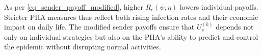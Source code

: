 \documentclass[sigconf,review]{acmart}
\begin{document}
As per \eqref{eq_sender_payoff_modified}, higher $R_c(\psi,\eta)$ lowers individual payoffs. Stricter PHA measures thus reflect both rising infection rates and their economic impact on daily life. The modified sender payoffs ensure that $U_s^{(k)}$ depends not only on individual strategies but also on the PHA’s ability to predict and control the epidemic without disrupting normal activities.


\end{document}
